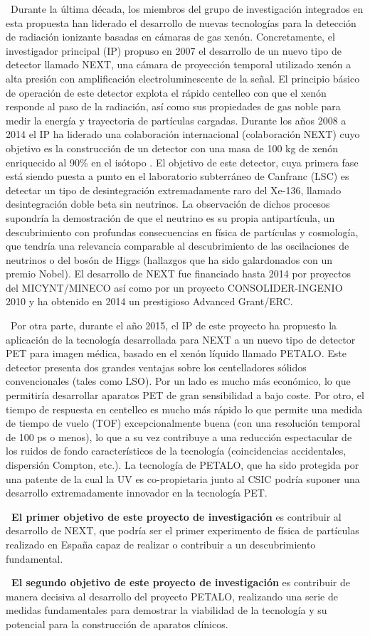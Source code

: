~Durante la última década, los miembros del grupo de investigación integrados en esta propuesta han liderado el desarrollo de nuevas tecnologías para la detección de radiación ionizante basadas en cámaras de gas xenón. Concretamente, el investigador principal (IP) propuso en 2007 el desarrollo de un nuevo tipo de detector llamado NEXT, una cámara de proyección temporal utilizado xenón a alta presión con amplificación electroluminescente de la señal. El principio básico de operación de este detector explota el rápido centelleo con que el xenón responde al paso de la radiación, así como sus propiedades de gas noble para medir la energía y trayectoria de partículas cargadas. Durante los años 2008 a 2014 el IP  ha liderado una colaboración internacional (colaboración NEXT) cuyo objetivo es la construcción de un detector con una masa de 100 kg de xenón enriquecido al 90\% en el isótopo \XE. El objetivo de este detector, cuya primera fase está siendo puesta a punto en el laboratorio subterráneo de Canfranc (LSC) es detectar un tipo de desintegración extremadamente raro del Xe-136, llamado desintegración doble beta sin neutrinos. La observación de dichos procesos supondría la demostración de que el neutrino es su propia antipartícula, un descubrimiento con profundas consecuencias en física de partículas y cosmología, que tendría una relevancia comparable al descubrimiento de las oscilaciones de neutrinos o del bosón de Higgs (hallazgos que ha sido galardonados con un premio Nobel). El desarrollo de NEXT fue financiado hasta 2014 por proyectos del MICYNT/MINECO así como por un proyecto CONSOLIDER-INGENIO 2010 y ha obtenido en 2014 un prestigioso Advanced Grant/ERC. 

~Por otra parte, durante el año 2015, el IP de este proyecto ha propuesto la aplicación de la tecnología desarrollada para NEXT a un nuevo tipo de detector PET para imagen médica, basado en el xenón líquido llamado PETALO. Este detector presenta dos grandes ventajas sobre los centelladores sólidos convencionales (tales como LSO). Por un lado es mucho más económico, lo que permitiría desarrollar aparatos PET de gran sensibilidad a bajo coste. Por otro, el tiempo de respuesta en centelleo es mucho más rápido lo que permite una medida de tiempo de vuelo (TOF) excepcionalmente buena (con una resolución temporal de 100 ps o menos), lo que a su vez contribuye a una reducción espectacular de los ruidos de fondo característicos de la tecnología (coincidencias accidentales, dispersión Compton, etc.). La tecnología de PETALO, que ha sido protegida por una patente de la cual la UV es co-propietaria junto al CSIC podría suponer una desarrollo extremadamente innovador en la tecnología PET.
 

{\bf ~El primer objetivo de este proyecto de investigación} es contribuir al desarrollo de NEXT, que podría ser el primer experimento de física de partículas realizado en España capaz de realizar o contribuir a un descubrimiento fundamental. 

{\bf ~El segundo objetivo de este proyecto de investigación} es contribuir de manera decisiva al desarrollo del proyecto PETALO, realizando una serie de medidas fundamentales para demostrar la viabilidad de la tecnología y su potencial para la construcción de aparatos clínicos. 